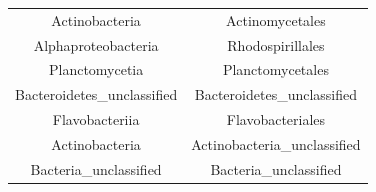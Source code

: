 \documentclass[]{article}
\begin{document}
\begin{longtable}[]{@{}cc@{}}
\begin{minipage}[t]{0.38\columnwidth}
Actinobacteria\strut
\end{minipage} & \begin{minipage}[t]{0.39\columnwidth}\centering
Actinomycetales\strut
\end{minipage}\tabularnewline
\begin{minipage}[t]{0.38\columnwidth}\centering
Alphaproteobacteria\strut
\end{minipage} & \begin{minipage}[t]{0.39\columnwidth}\centering
Rhodospirillales\strut
\end{minipage}\tabularnewline
\begin{minipage}[t]{0.38\columnwidth}\centering
Planctomycetia\strut
\end{minipage} & \begin{minipage}[t]{0.39\columnwidth}\centering
Planctomycetales\strut
\end{minipage}\tabularnewline
\begin{minipage}[t]{0.38\columnwidth}\centering
Bacteroidetes\_unclassified\strut
\end{minipage} & \begin{minipage}[t]{0.39\columnwidth}\centering
Bacteroidetes\_unclassified\strut
\end{minipage}\tabularnewline
\begin{minipage}[t]{0.38\columnwidth}\centering
Flavobacteriia\strut
\end{minipage} & \begin{minipage}[t]{0.39\columnwidth}\centering
Flavobacteriales\strut
\end{minipage}\tabularnewline
\begin{minipage}[t]{0.38\columnwidth}\centering
Actinobacteria\strut
\end{minipage} & \begin{minipage}[t]{0.39\columnwidth}\centering
Actinobacteria\_unclassified\strut
\end{minipage}\tabularnewline
\begin{minipage}[t]{0.38\columnwidth}\centering
Bacteria\_unclassified\strut
\end{minipage} & \begin{minipage}[t]{0.39\columnwidth}\centering
Bacteria\_unclassified\strut
\end{minipage}\tabularnewline
\bottomrule
\end{longtable}
\end{document}
